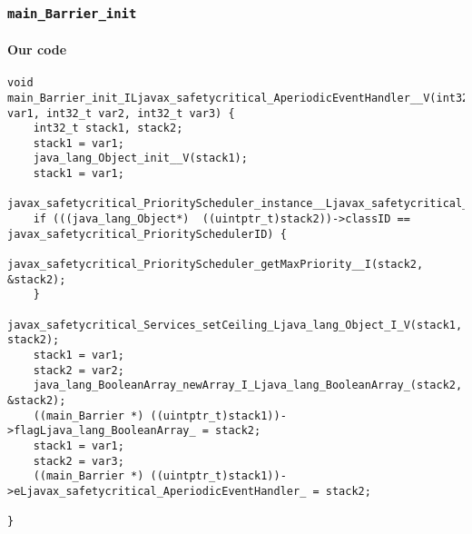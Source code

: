 \subsubsection{\texttt{main\_Barrier\_init}}

\paragraph{Our code}\hfill
\begin{lstlisting}[firstnumber=1728]
void main_Barrier_init_ILjavax_safetycritical_AperiodicEventHandler__V(int32_t var1, int32_t var2, int32_t var3) {
	int32_t stack1, stack2;
	stack1 = var1;
	java_lang_Object_init__V(stack1);
	stack1 = var1;
	javax_safetycritical_PriorityScheduler_instance__Ljavax_safetycritical_PriorityScheduler_(&stack2);
	if (((java_lang_Object*)  ((uintptr_t)stack2))->classID == javax_safetycritical_PrioritySchedulerID) {
		javax_safetycritical_PriorityScheduler_getMaxPriority__I(stack2, &stack2);
	}
	javax_safetycritical_Services_setCeiling_Ljava_lang_Object_I_V(stack1, stack2);
	stack1 = var1;
	stack2 = var2;
	java_lang_BooleanArray_newArray_I_Ljava_lang_BooleanArray_(stack2, &stack2);
	((main_Barrier *) ((uintptr_t)stack1))->flagLjava_lang_BooleanArray_ = stack2;
	stack1 = var1;
	stack2 = var3;
	((main_Barrier *) ((uintptr_t)stack1))->eLjavax_safetycritical_AperiodicEventHandler_ = stack2;

}
\end{lstlisting}

